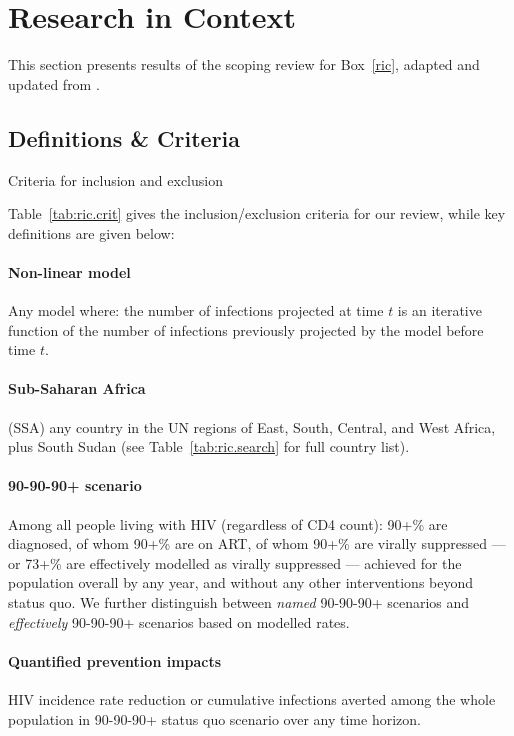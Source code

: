 \section{Research in Context}\label{sr.ric}
This section presents results of the scoping review for Box~\ref{ric},
adapted and updated from \cite{Knight2022sr}.
\subsection{Definitions \& Criteria}\label{sr.ric.def}
\begin{table}[b]
  \centering
  \caption{Criteria for inclusion and exclusion}
  
  \label{tab:ric.crit}
\end{table}
Table~\ref{tab:ric.crit} gives the inclusion/exclusion criteria for our review,
while key definitions are given below:
\paragraph{Non-linear model}
Any model where:
the number of infections projected at time $t$ is an iterative function of
the number of infections previously projected by the model before time $t$.
\paragraph{Sub-Saharan Africa} (SSA)
any country in the UN regions of East, South, Central, and West Africa, plus South Sudan
(see Table~\ref{tab:ric.search} for full country list).
\paragraph{90-90-90+ scenario}
Among all people living with HIV (regardless of CD4 count):
90+\% are diagnosed, of whom 90+\% are on ART, of whom 90+\% are virally suppressed
--- or 73+\% are effectively modelled as virally suppressed ---
achieved for the population overall by any year,
and without any other interventions beyond status quo.
We further distinguish between
\emph{named} 90-90-90+ scenarios and
\emph{effectively} 90-90-90+ scenarios based on modelled rates.
\paragraph{Quantified prevention impacts}
HIV incidence rate reduction or cumulative infections averted among the whole population
in 90-90-90+ \vs status quo scenario over any time horizon.
